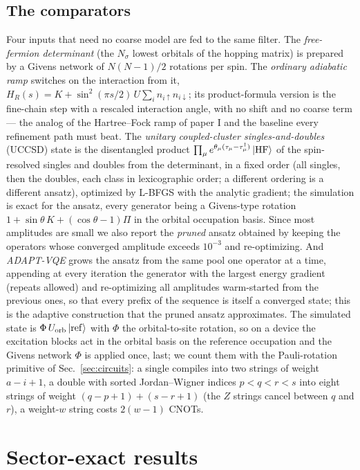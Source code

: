 \documentclass[a4paper,11pt,noarxiv]{quantumarticle}
\begin{document}
\subsection{The comparators}
\label{sec:uccsd}
Four inputs that need no coarse model are fed to the same filter.  The
\emph{free-fermion determinant} (the $N_\sigma$ lowest orbitals of the
hopping matrix) is prepared by a Givens network of $N(N-1)/2$ rotations per
spin.  The \emph{ordinary adiabatic ramp} switches on the interaction from
it, $H_R(s)=K+\sin^2(\pi s/2)\,U\sum_in_{i\uparrow}n_{i\downarrow}$; its
product-formula version is the fine-chain step with a rescaled interaction
angle, with no shift and no coarse term --- the analog of the Hartree--Fock
ramp of paper I and the baseline every refinement path must beat.  The
\emph{unitary coupled-cluster singles-and-doubles} (UCCSD) state is the
disentangled product $\prod_\mu e^{\theta_\mu(\tau_\mu-\tau_\mu^\dagger)}\ket{\rm HF}$
of the spin-resolved singles and doubles from the determinant, in a fixed
order (all singles, then the doubles, each class in lexicographic order; a
different ordering is a different ansatz), optimized by L-BFGS with the
analytic gradient; the simulation is exact for the ansatz, every generator
being a Givens-type rotation $1+\sin\theta\,K+(\cos\theta-1)\Pi$ in the
orbital occupation basis.  Since most amplitudes are small we also report
the \emph{pruned} ansatz obtained by keeping the operators whose converged
amplitude exceeds $10^{-3}$ and re-optimizing.  And \emph{ADAPT-VQE}
grows the ansatz from the same pool one operator at a time, appending at
every iteration the generator with the largest energy gradient (repeats
allowed) and re-optimizing all amplitudes warm-started from the previous
ones, so that every prefix of the sequence is itself a converged state;
this is the adaptive construction that the pruned ansatz approximates.  The
simulated state is $\Phi\,U_{\rm orb}\ket{\rm ref}$ with $\Phi$ the
orbital-to-site rotation, so on a device the excitation blocks act in the
orbital basis on the reference occupation and the Givens network $\Phi$ is
applied once, last; we count them with the Pauli-rotation primitive of
Sec.~\ref{sec:circuits}: a single compiles into two strings of weight
$a-i+1$, a double with sorted Jordan--Wigner indices $p<q<r<s$ into eight
strings of weight $(q-p+1)+(s-r+1)$ (the $Z$ strings cancel between $q$ and
$r$), a weight-$w$ string costs $2(w-1)$ CNOTs.

\section{Sector-exact results}
\label{sec:results}
\end{document}
